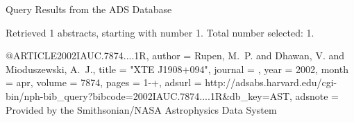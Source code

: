 Query Results from the ADS Database


Retrieved 1 abstracts, starting with number 1.  Total number selected: 1.

@ARTICLE{2002IAUC.7874....1R,
   author = {{Rupen}, M.~P. and {Dhawan}, V. and {Mioduszewski}, A.~J.},
    title = "{XTE J1908+094}",
  journal = {\iaucirc},
     year = 2002,
    month = apr,
   volume = 7874,
    pages = {1-+},
   adsurl = {http://adsabs.harvard.edu/cgi-bin/nph-bib_query?bibcode=2002IAUC.7874....1R&db_key=AST},
  adsnote = {Provided by the Smithsonian/NASA Astrophysics Data System}
}


